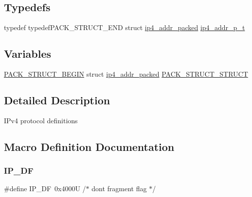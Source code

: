\subsection*{Typedefs}
\begin{DoxyCompactItemize}
\item 
typedef typedef\+P\+A\+C\+K\+\_\+\+S\+T\+R\+U\+C\+T\+\_\+\+E\+ND struct \hyperlink{structip4__addr__packed}{ip4\+\_\+addr\+\_\+packed} \hyperlink{openmote-cc2538_2lwip_2src_2include_2lwip_2prot_2ip4_8h_ae5011654fcbadf6b6582b8d49446107f}{ip4\+\_\+addr\+\_\+p\+\_\+t}
\end{DoxyCompactItemize}
\subsection*{Variables}
\begin{DoxyCompactItemize}
\item 
\hyperlink{group__compiler__abstraction_ga73199061891adf1b912d20835c7d5e96}{P\+A\+C\+K\+\_\+\+S\+T\+R\+U\+C\+T\+\_\+\+B\+E\+G\+IN} struct \hyperlink{structip4__addr__packed}{ip4\+\_\+addr\+\_\+packed} \hyperlink{openmote-cc2538_2lwip_2src_2include_2lwip_2prot_2ip4_8h_a7082e3ecbecbf496df63fda29a1e0f06}{P\+A\+C\+K\+\_\+\+S\+T\+R\+U\+C\+T\+\_\+\+S\+T\+R\+U\+CT}
\end{DoxyCompactItemize}


\subsection{Detailed Description}
I\+Pv4 protocol definitions 

\subsection{Macro Definition Documentation}
\mbox{\label{openmote-cc2538_2lwip_2src_2include_2lwip_2prot_2ip4_8h_ae2473f4a88d141d5298f92a4335b714a}} 
\subsubsection{\texorpdfstring{I\+P\+\_\+\+DF}{IP\_DF}}
{\footnotesize\ttfamily \#define I\+P\+\_\+\+DF~0x4000\+U        /$\ast$ don\textquotesingle{}t fragment flag $\ast$/}

